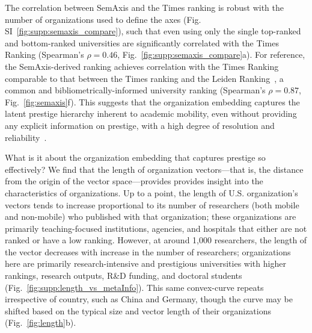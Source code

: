 \documentclass[12pt]{article} %
\begin{document}
The correlation between SemAxis and the Times ranking is robust with the number of organizations used to define the axes (Fig. SI~\ref{fig:supp:semaxis_compare}), such that even using only the single top-ranked and bottom-ranked universities are significantly correlated with the Times Ranking (Spearman's $\rho = 0.46$, Fig.~\ref{fig:supp:semaxis_compare}a).
For reference, the SemAxis-derived ranking achieves correlation with the Times Ranking comparable to that between the Times ranking and the Leiden Ranking~\autocite{waltman2012leidenrankings}, a common and bibliometrically-informed university ranking (Spearman's $\rho = 0.87$, Fig.~\ref{fig:semaxis}f).
This suggests that the organization embedding captures the latent prestige hierarchy inherent to academic mobility, even without providing any explicit information on prestige, with a high degree of resolution and reliability~\autocite{deville2014career, clauset2015hierarchy}. 

What is it about the organization embedding that captures prestige so effectively?
We find that the length of organization vectors---that is, the distance from the origin of the vector space---provides provides insight into the characteristics of organizations. 
Up to a point, the length of U.S. organization's vectors tends to increase proportional to its number of researchers (both mobile and non-mobile) who published with that organization;
these organizations are primarily teaching-focused institutions, agencies, and hospitals that either are not ranked or have a low ranking. 
However, at around 1,000 researchers, the length of the vector decreases with increase in the number of researchers;
organizations here are primarily research-intensive and prestigious universities with higher rankings, research outputs, R\&D funding, and doctoral students (Fig.~\ref{fig:supp:length_vs_metaInfo}).
This same convex-curve repeats irrespective of country, such as China and Germany, though the curve may be shifted based on the typical size and vector length of their organizations (Fig.~\ref{fig:length}b). 
\end{document}
